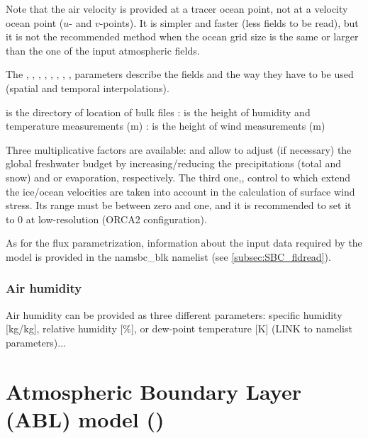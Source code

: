 \documentclass[../main/NEMO_manual]{subfiles}
\begin{document}
Note that the air velocity is provided at a tracer ocean point, not at a velocity ocean point ($u$- and $v$-points).
It is simpler and faster (less fields to be read), but it is not the recommended method when
the ocean grid size is the same or larger than the one of the input atmospheric fields.

The , , , , , , ,
,  parameters describe the fields and the way they have to be used
(spatial and temporal interpolations).

 is the directory of location of bulk files
: is the height of humidity and temperature measurements (m)
: is the height of wind measurements (m)

Three multiplicative factors are available:
 and  allow to adjust (if necessary) the global freshwater budget by
increasing/reducing the precipitations (total and snow) and or evaporation, respectively.
The third one,, control to which extend the ice/ocean velocities are taken into account in
the calculation of surface wind stress.
Its range must be between zero and one, and it is recommended to set it to 0 at low-resolution (ORCA2 configuration).

As for the flux parametrization, information about the input data required by the model is provided in
the namsbc\_blk namelist (see \autoref{subsec:SBC_fldread}).

\subsubsection{Air humidity}

Air humidity can be provided as three different parameters: specific humidity
[kg/kg], relative humidity [\%], or dew-point temperature [K] (LINK to namelist
parameters)...

\section[Atmospheric Boundary Layer (ABL) model (\textit{sbcabl.F90})]{Atmospheric Boundary Layer (ABL) model (\protect{})}
\label{sec:SBC_abl}
\end{document}
